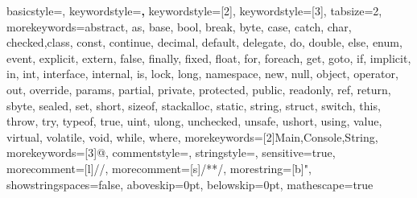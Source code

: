 {
	basicstyle=\small\ttfamily,
	keywordstyle=\KeywordsColor\textbf,
	keywordstyle=[2]\UserKeywordsColor,
	keywordstyle=[3]\StringColor,
	tabsize=2,
	morekeywords={abstract, as, base, bool, break, byte, case, 
		catch, char, checked,class, const, continue, decimal, 
		default, delegate, do, double, else, enum, event, explicit,
		extern, false, finally, fixed, float, for, foreach, get, goto, 
		if, implicit, in, int, interface, internal, is, lock, long,
		namespace, new, null, object, operator, out, override, 
		params, partial, private, protected, public, readonly, ref, return, 
		sbyte, sealed, set, short, sizeof, stackalloc, static, string,
		struct, switch, this, throw, try, typeof, true, uint, ulong, 
		unchecked, unsafe, ushort, using, value, virtual, volatile,
		void, while, where},
	morekeywords=[2]{Main,Console,String},
	morekeywords=[3]{@}, 
	commentstyle=\CommentColor,
	stringstyle=\StringColor,
	sensitive=true,
	morecomment=[l]{//},
	morecomment=[s]{/*}{*/},
	morestring=[b]",
	showstringspaces=false,
	aboveskip=0pt, 
	belowskip=0pt,
	mathescape=true
}

\lstset{language=CSharp}

\newcommand{\inguandesheader}{
	\texttt{[image: uandes.pdf]}\hspace*{\fill}
}

\newcommand{\evaluationtitle}[2]{
	\begin{center}
	\vspace{1ex}\Large #1\\
	\vspace{1ex}\small #2
	\end{center}
}


\newenvironment{guideexercise}[3]{
	\noindent\textbf{#1}	
	\vspace{-0.3cm}
	\begin{framed}
		\noindent\textsl{Dificultad:} #2\\
		\textsl{Etiquetas:} #3\\	
				
}{
	\end{framed}
	\vspace{0.3cm}
}
